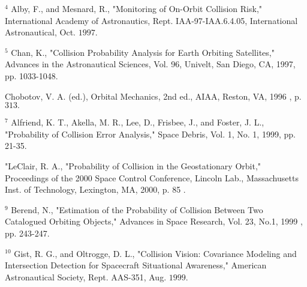 \documentclass[10pt]{article}
\begin{document}
${ }^{4}$ Alby, F., and Mesnard, R., "Monitoring of On-Orbit Collision Risk," International Academy of Astronautics, Rept. IAA-97-IAA.6.4.05, International Astronautical, Oct. $1997 .$

${ }^{5}$ Chan, K., "Collision Probability Analysis for Earth Orbiting Satellites," Advances in the Astronautical Sciences, Vol. 96, Univelt, San Diego, CA, 1997, pp. 1033-1048.

Chobotov, V. A. (ed.), Orbital Mechanics, 2nd ed., AIAA, Reston, VA, 1996 , p. $313 .$

${ }^{7}$ Alfriend, K. T., Akella, M. R., Lee, D., Frisbee, J., and Foster, J. L., "Probability of Collision Error Analysis," Space Debris, Vol. 1, No. 1, 1999, pp. 21-35.

"LeClair, R. A., "Probability of Collision in the Geostationary Orbit," Proceedings of the 2000 Space Control Conference, Lincoln Lab., Massachusetts Inst. of Technology, Lexington, MA, 2000, p. 85 .

${ }^{9}$ Berend, N., "Estimation of the Probability of Collision Between Two Catalogued Orbiting Objects," Advances in Space Research, Vol. 23, No.1, 1999 , pp. 243-247.

${ }^{10}$ Gist, R. G., and Oltrogge, D. L., "Collision Vision: Covariance Modeling and Intersection Detection for Spacecraft Situational Awareness," American Astronautical Society, Rept. AAS-351, Aug. $1999 .$
\end{document}
